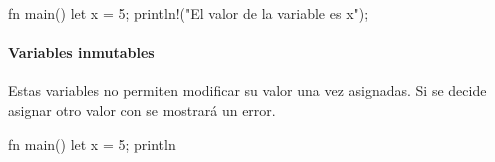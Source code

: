 \begin{codeblock}
  fn main() {
    let x = 5;
    println!("El valor de la variable es {x}");
  }
\end{codeblock}

\paragraph{Variables inmutables} Estas variables no permiten modificar su valor una vez
asignadas. Si se decide asignar otro valor con \codeline{=} se mostrará un error. 

\begin{codeblock}
  fn main() {
    let x = 5;
    println
  }
\end{codeblock}